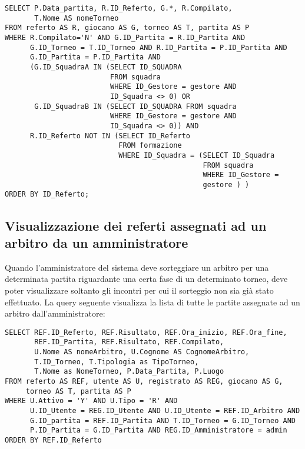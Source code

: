 \begin{lstlisting}
SELECT P.Data_partita, R.ID_Referto, G.*, R.Compilato,
       T.Nome AS nomeTorneo
FROM referto AS R, giocano AS G, torneo AS T, partita AS P
WHERE R.Compilato='N' AND G.ID_Partita = R.ID_Partita AND
      G.ID_Torneo = T.ID_Torneo AND R.ID_Partita = P.ID_Partita AND
      G.ID_Partita = P.ID_Partita AND 
      (G.ID_SquadraA IN (SELECT ID_SQUADRA
                         FROM squadra
                         WHERE ID_Gestore = gestore AND
                         ID_Squadra <> 0) OR
       G.ID_SquadraB IN (SELECT ID_SQUADRA FROM squadra
                         WHERE ID_Gestore = gestore AND
                         ID_Squadra <> 0)) AND
      R.ID_Referto NOT IN (SELECT ID_Referto
                           FROM formazione
                           WHERE ID_Squadra = (SELECT ID_Squadra
                                               FROM squadra
                                               WHERE ID_Gestore =
                                               gestore ) )
ORDER BY ID_Referto;
\end{lstlisting}

\subsection*{Visualizzazione dei referti assegnati ad un arbitro da un amministratore}
Quando l'amministratore del sistema deve sorteggiare un arbitro per una determinata partita riguardante una certa fase di un determinato torneo, deve poter visualizzare soltanto gli incontri per cui il sorteggio non sia già stato effettuato. La query seguente visualizza la lista di tutte le partite assegnate ad un arbitro dall'amministratore:

\begin{lstlisting}
SELECT REF.ID_Referto, REF.Risultato, REF.Ora_inizio, REF.Ora_fine,
       REF.ID_Partita, REF.Risultato, REF.Compilato,
       U.Nome AS nomeArbitro, U.Cognome AS CognomeArbitro,
       T.ID_Torneo, T.Tipologia as TipoTorneo,
       T.Nome as NomeTorneo, P.Data_Partita, P.Luogo
FROM referto AS REF, utente AS U, registrato AS REG, giocano AS G,
     torneo AS T, partita AS P
WHERE U.Attivo = 'Y' AND U.Tipo = 'R' AND
      U.ID_Utente = REG.ID_Utente AND U.ID_Utente = REF.ID_Arbitro AND
      G.ID_partita = REF.ID_Partita AND T.ID_Torneo = G.ID_Torneo AND
      P.ID_Partita = G.ID_Partita AND REG.ID_Amministratore = admin
ORDER BY REF.ID_Referto
\end{lstlisting}

